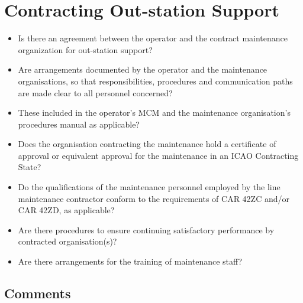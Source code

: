\documentclass[11pt]{article}
\begin{document}
\section*{Contracting Out-station Support}

\begin{itemize}[leftmargin=*]
    \item Is there an agreement between the operator and the contract maintenance organization for out-station support? \hfill {} 
    \item Are arrangements documented by the operator and the maintenance organisations, so that responsibilities, procedures and communication paths are made clear to all personnel concerned? \hfill {} 
    \item These included in the operator’s MCM and the maintenance organisation’s procedures manual as applicable? \hfill {} 
    \item Does the organisation contracting the maintenance hold a certificate of approval or equivalent approval for the maintenance in an ICAO Contracting State? \hfill {} 
    \item Do the qualifications of the maintenance personnel employed by the line maintenance contractor conform to the requirements of CAR 42ZC and/or CAR 42ZD, as applicable? \hfill {} 
    \item Are there procedures to ensure continuing satisfactory performance by contracted organisation(s)? \hfill {} 
    \item Are there arrangements for the training of maintenance staff? \hfill {} 
\end{itemize}

\subsection*{Comments}

\noindent\makebox[\linewidth]{\rule{\textwidth}{0.4pt}} %

\noindent\makebox[\linewidth]{\rule{\textwidth}{0.4pt}} %
\end{document}

